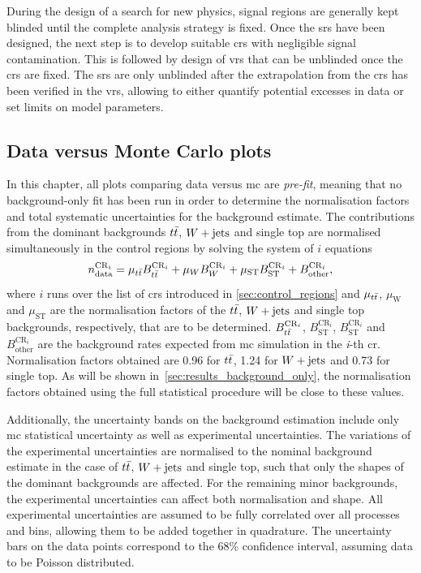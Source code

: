 During the design of a search for new physics, signal regions are generally kept blinded until the complete analysis strategy is fixed. Once the \glspl{sr} have been designed, the next step is to develop suitable \glspl{cr} with negligible signal contamination. This is followed by design of \glspl{vr} that can be unblinded once the \glspl{cr} are fixed. The \glspl{sr} are only unblinded after the extrapolation from the \glspl{cr} has been verified in the \glspl{vr}, allowing to either quantify potential excesses in data or set limits on model parameters. 

\subsection{Data versus Monte Carlo plots}

In this chapter, all plots comparing data versus \gls{mc} are \textit{pre-fit}, meaning that no background-only fit has been run in order to determine the normalisation factors and total systematic uncertainties for the background estimate. The contributions from the dominant backgrounds $t\bar{t}$, $W+\mathrm{jets}$ and single top are normalised simultaneously in the control regions by solving the system of $i$ equations
\begin{equation}
		n_\mathrm{data}^{\mathrm{CR}_i} = \mu_{t\bar{t}} B_{t\bar{t}}^{\mathrm{CR}_i} + \mu_{W} B_{W}^{\mathrm{CR}_i} + \mu_\mathrm{ST} B_\mathrm{ST}^{\mathrm{CR}_i} + B_\mathrm{other}^{\mathrm{CR}_i},
\end{equation}
where $i$ runs over the list of \glspl{cr} introduced in \cref{sec:control_regions} and $\mu_{t\bar{t}}$, $\mu_\mathrm{W}$ and $\mu_\mathrm{ST}$ are the normalisation factors of the $t\bar{t}$, $W+\mathrm{jets}$ and single top backgrounds, respectively, that are to be determined. $B_{t\bar{t}}^{\mathrm{CR}_i}$, $B_\mathrm{ST}^{\mathrm{CR}_i}$, $B_\mathrm{ST}^{\mathrm{CR}_i}$ and $B_\mathrm{other}^{\mathrm{CR}_i}$ are the background rates expected from \gls{mc} simulation in the \textit{i}-th \gls{cr}. Normalisation factors obtained are 0.96 for $t\bar{t}$, 1.24 for $W+\mathrm{jets}$ and 0.73 for single top. As will be shown in~\cref{sec:results_background_only}, the normalisation factors obtained using the full statistical procedure will be close to these values.

Additionally, the uncertainty bands on the background estimation include only \gls{mc} statistical uncertainty as well as experimental uncertainties. The variations of the experimental uncertainties are normalised to the nominal background estimate in the case of $t\bar{t}$, $W+\mathrm{jets}$ and single top, such that only the shapes of the dominant backgrounds are affected. For the remaining minor backgrounds, the experimental uncertainties can affect both normalisation and shape. All experimental uncertainties are assumed to be fully correlated over all processes and bins, allowing them to be added together in quadrature. The uncertainty bars on the data points correspond to the 68\% confidence interval, assuming data to be Poisson distributed. 

